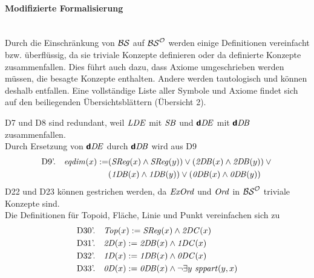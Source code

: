 \paragraph{Modifizierte Formalisierung}\ \\
Durch die Einschränkung von $\mathcal{BS}$ auf $\mathcal{BS}^{\mathcal{O}}$ werden einige Definitionen vereinfacht bzw. überflüssig, da sie triviale Konzepte definieren oder da definierte Konzepte zusammenfallen.
Dies führt auch dazu, dass Axiome umgeschrieben werden müssen, die besagte Konzepte enthalten. 
Andere werden tautologisch und können deshalb entfallen.
Eine vollständige Liste aller Symbole und Axiome findet sich auf den beiliegenden Übersichtsblättern (Übersicht 2).

D7 und D8 sind redundant, weil $\mathit{LDE}$ mit $\mathit{S\hspace*{-0.25ex}B}$ und $\mathit{\boldsymbol{\mathsf{d}}D\hspace*{-0.25ex} E}$ mit $\mathit{\boldsymbol{\mathsf{d}}D\hspace*{-0.25ex} B}$ zusammenfallen.\\
Durch Ersetzung von $\mathit{\boldsymbol{\mathsf{d}}D\hspace*{-0.25ex} E}$ durch $\mathit{\boldsymbol{\mathsf{d}}D\hspace*{-0.25ex} B}$ wird aus D9
\begin{align*}
 \text{D9'.} \quad \mathit{eqdim}(x) := 
      &(\mathit{S\hspace*{-0.25ex}Reg}(x) \wedge \mathit{S\hspace*{-0.25ex}Reg}(y)) \vee (\mathit{2D\hspace*{-0.25ex} B}(x) \wedge \mathit{2D\hspace*{-0.25ex} B}(y)) \vee \mbox{} \\ 
			&(\mathit{1D\hspace*{-0.25ex} B}(x) \wedge \mathit{1D\hspace*{-0.25ex} B}(y)) \vee (\mathit{0D\hspace*{-0.25ex} B}(x) \wedge \mathit{0D\hspace*{-0.25ex} B}(y))
\end{align*}
%
D22 und D23 können gestrichen werden, da $\mathit{ExOrd}$ und $\mathit{Ord}$  in $\mathcal{BS}^{\mathcal{O}}$ triviale Konzepte sind.\\
%
Die Definitionen für Topoid, Fläche, Linie und Punkt vereinfachen sich zu  
%
\begin{align*}
 &\text{D30'.} \quad \GTop(x) := \GSReg(x) \wedge \GtwoDC(x)\\
 &\text{D31'.} \quad \GtwoD(x) := \GtwoDB(x) \wedge \GoneDC(x)\\
 &\text{D32'.} \quad \GoneD(x) := \GoneDB(x) \wedge \GzeroDC(x) \\
 &\text{D33'.} \quad \GzeroD(x) := \GzeroDB(x) \wedge \neg \exists y\ \Gsppart(y,x)
\end{align*}
%
